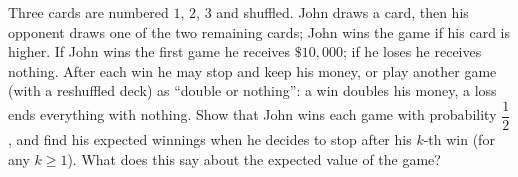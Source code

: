 Three cards are numbered $1$, $2$, $3$ and shuffled. John draws a card, then his opponent draws one of the two remaining cards; John wins the game if his card is higher. If John wins the first game he receives $\$10{,}000$; if he loses he receives nothing. After each win he may stop and keep his money, or play another game (with a reshuffled deck) as ``double or nothing'': a win doubles his money, a loss ends everything with nothing. Show that John wins each game with probability $\dfrac12$, and find his expected winnings when he decides to stop after his $k$-th win (for any $k\ge1$). What does this say about the expected value of the game?
